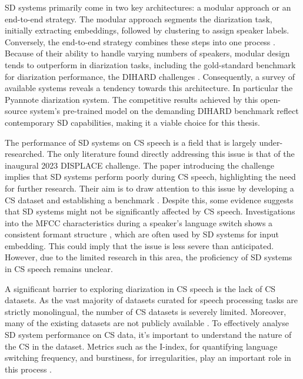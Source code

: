 \documentclass[11pt, a4paper]{report}
\begin{document}
SD systems primarily come in two key architectures: a
modular approach or an end-to-end strategy. The modular approach segments 
the diarization task, initially extracting embeddings, followed by 
clustering to assign speaker labels. Conversely, the end-to-end strategy 
combines these steps into one process \cite{parkReviewSpeakerDiarization2021}. 
Because of their ability to handle varying numbers of speakers, modular 
design tends to outperform in diarization tasks, including the gold-standard benchmark for diarization 
performance, the DIHARD challenges \cite{heoNAVERCLOVASUBMISSION}. 
Consequently, a survey of available systems reveals a tendency towards this architecture.
In particular the Pyannote diarization system. The competitive results achieved by 
this open-source system's pre-trained model on the demanding DIHARD benchmark 
\cite{PyannoteSpeakerdiarizationHugging2023} reflect contemporary SD capabilities, 
making it a viable choice for this thesis.

\vspace*{10pt}
The performance of SD systems on CS speech is a field that is largely under-researched.
The only literature found directly addressing this issue is that of the inaugural 
2023 DISPLACE challenge. The paper introducing the challenge implies that SD systems 
perform poorly during CS speech, highlighting the need for further research. Their 
aim is to draw attention to this issue by developing a CS dataset and establishing a benchmark 
\cite{baghelDISPLACEChallengeDIarization2023b}.
Despite this, some evidence suggests that SD systems might not be significantly 
affected by CS speech. Investigations into the MFCC characteristics during a speaker's language 
switch shows a consistent formant structure \cite{mishraChallengesSpokenLanguage2023}, 
which are often used by SD systems for input embedding. This could imply that the issue 
is less severe than anticipated. However, due to the limited research in this area, the 
proficiency of SD systems in CS speech remains unclear.

\vspace*{10pt}
A significant barrier to exploring diarization in CS speech is the lack of CS datasets. 
As the vast majority of datasets curated for speech processing tasks are strictly 
monolingual, the number of CS datasets is severely limited. Moreover, many of the 
existing datasets are not publicly available \cite[9]{sitaramSurveyCodeswitchedSpeech2020}.
To effectively analyse SD system performance on CS data, it's important to understand 
the nature of the CS in the dataset. Metrics such as the I-index, for quantifying 
language switching frequency, and burstiness, for irregularities, play an important 
role in this process \cite{guzmanMetricsModelingCodeSwitching2017}.
\end{document}
